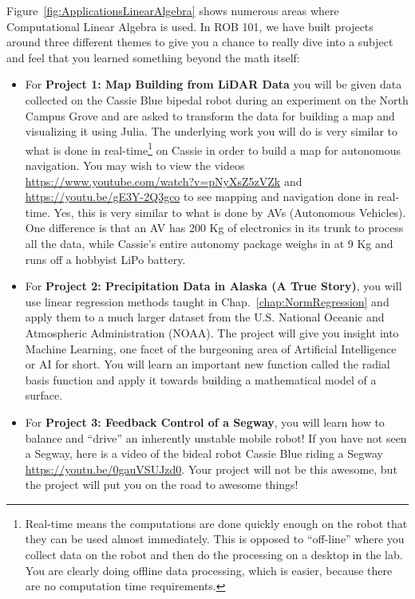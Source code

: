 Figure~\ref{fig:ApplicationsLinearAlgebra} shows numerous areas where Computational Linear Algebra is used. In ROB 101, we have built projects around three different themes to give you a chance to really dive into a subject and feel that you learned something beyond the math itself:
\begin{itemize}
    \item For \textbf{Project 1: Map Building from LiDAR Data} you will be given data collected on the Cassie Blue bipedal robot during an experiment on the North Campus Grove and are asked to transform the data for building a map and visualizing it using Julia. The underlying work you will do is very similar to what is done in real-time\footnote{Real-time means the computations are done quickly enough on the robot that they can be used almost immediately. This is opposed to ``off-line'' where you collect data on the robot and then do the processing on a desktop in the lab. You are clearly doing offline data processing, which is easier, because there are no computation time requirements.} on Cassie in order to build a map for autonomous navigation. You may wish to view the videos \url{https://www.youtube.com/watch?v=pNyXsZ5zVZk} and \url{https://youtu.be/gE3Y-2Q3gco} to see mapping and navigation done in real-time. Yes, this is very similar to what is done by AVs (Autonomous Vehicles). One difference is that an AV has 200 Kg of electronics in its trunk to process all the data, while Cassie's entire autonomy package weighs in at 9 Kg and runs off a hobbyist LiPo battery. 
    \item For \textbf{Project 2: Precipitation Data in Alaska (A True Story)}, you will use linear regression methods taught in Chap.~\ref{chap:NormRegression} and apply them to a much larger dataset from the U.S. National Oceanic and Atmospheric Administration (NOAA). The project will give you insight into Machine Learning, one facet of the burgeoning area of Artificial Intelligence or AI for short. You will learn an important new function called the radial basis function and apply it towards building a mathematical model of a surface.
    \item For \textbf{Project 3: Feedback Control of a Segway}, you will learn how to balance and ``drive'' an inherently unstable mobile robot! If you have not seen a Segway, here is a video of the bideal robot Cassie Blue riding a Segway \url{https://youtu.be/0gauVSUJzd0}. Your project will not be this awesome, but the project will put you on the road to awesome things!
\end{itemize}

